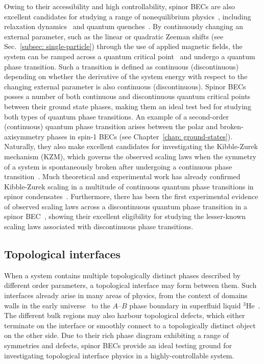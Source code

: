 Owing to their accessibility and high controllability, spinor BECs are also
excellent candidates for studying a range of nonequilibrium
physics~\cite{Schmaljohann2004}, including
relaxation dynamics~\cite{Gring2012, Reeves2022} and quantum
quenches~\cite{Sadler2006,Barnett2011,Navon2015,Symes2017,Kang2017,Prufer2018,
Schmied2019,Liu2020}.
By continuously changing an external parameter, such as the linear or quadratic
Zeeman shifts (see Sec.~\ref{subsec: single-particle}) through the use of
applied magnetic fields, the system can be ramped across a
quantum critical point~\cite{Sachdev2011} and undergo a quantum phase
transition.
Such a transition is defined as continuous (discontinuous) depending on whether
the derivative of the system energy with respect to the changing external
parameter is also continuous (discontinuous).
Spinor BECs posses a number of both continuous and discontinuous quantum
critical points between their ground state phases, making them an ideal test bed
for studying both types of quantum phase transitions.
An example of a second-order (continuous) quantum phase transition arises
between the polar and broken-axisymmetry phases in spin-1 BECs (see
Chapter~\ref{chap: ground-states}).
Naturally, they also make excellent candidates for investigating the
Kibble-Zurek mechanism (KZM), which governs the observed scaling laws when the
symmetry of a system is spontaneously broken after undergoing a continuous phase
transition~\cite{DelCampo2014}.
Much theoretical and experimental work has already confirmed Kibble-Zurek
scaling in a multitude of continuous quantum phase transitions in spinor
condensates~\cite{Sadler2006, Damski2006,Damski2007, Lamacraft2007,Saito2007,
Saito2007a,Vengalattore2008, Swislocki2013, Witkowska2013, Anquez2016,
Williamson2016,Kang2017}.
Furthermore, there has been the first experimental evidence of observed scaling
laws across a discontinuous quantum phase transition in a spinor
BEC~\cite{Qiu2020}, showing their excellent eligibility for studying the
lesser-known scaling laws associated with discontinuous phase transitions.

\subsection{Topological interfaces}
When a system contains multiple topologically distinct phases described by
different order parameters, a topological interface may form between them.
Such interfaces already arise in many areas of physics, from the context of
domains walls in the early universe~\cite{Zeldovich1975,Kibble1976,Kibble1980}
to the \(A\)--\(B\) phase boundary in superfluid liquid \(^3\)He~\cite{
Osheroff1977,Yip1986,Salomaa1987,Finne2006,Bradley2008,Volovik2009}.
The different bulk regions may also harbour topological defects, which either
terminate on the interface or smoothly connect to a topologically distinct
object on the other side.
Due to their rich phase diagram exhibiting a range of symmetries and defects,
spinor BECs provide an ideal testing ground for investigating topological
interface physics in a highly-controllable system.

